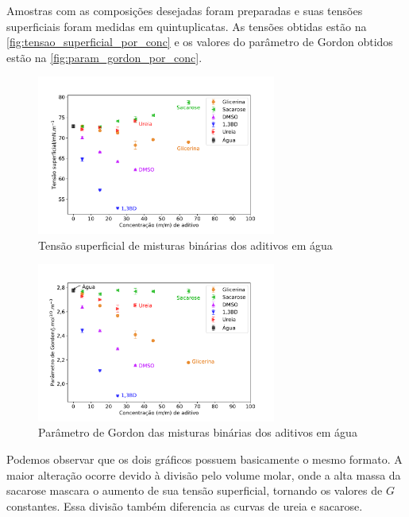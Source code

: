 		Amostras com as composições desejadas foram preparadas e suas tensões superficiais foram medidas em quintuplicatas. As tensões obtidas estão na \autoref{fig:tensao_superficial_por_conc} e os valores do parâmetro de Gordon obtidos estão na \autoref{fig:param_gordon_por_conc}.
		
		\begin{figure}[h]
			\centering
			\includegraphics[width=0.7\textwidth]{imagens/propriedades/tensao_superficial}
			\caption{Tensão superficial de misturas binárias dos aditivos em água}
			\label{fig:tensao_superficial_por_conc}
		\end{figure}
		
		\begin{figure}[h]
			\centering
			\includegraphics[width=0.7\textwidth]{imagens/propriedades/param_gordon}
			\caption{Parâmetro de Gordon das misturas binárias dos aditivos em água}
			\label{fig:param_gordon_por_conc}
		\end{figure}
		
		Podemos observar que os dois gráficos possuem basicamente o mesmo formato. A maior alteração ocorre devido à divisão pelo volume molar, onde a alta massa da sacarose mascara o aumento de sua tensão superficial, tornando os valores de \(G\) constantes. Essa divisão também diferencia as curvas de ureia e sacarose.
		
